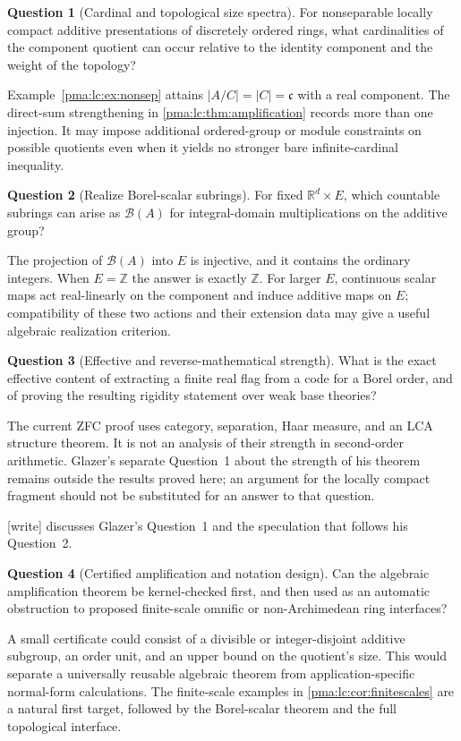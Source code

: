 \documentclass[11pt]{article}
\numberwithin{equation}{section}
\theoremstyle{definition}
\newtheorem{question}[question]{Question}
\theoremstyle{remark}
\newcommand{\Z}{\mathbb Z}
\newcommand{\R}{\mathbb R}
\newcommand{\writetag}{\textup{\textsf{\small[write]}}}
\begin{document}
\begin{question}[Cardinal and topological size spectra]
For nonseparable locally compact additive presentations of discretely
ordered rings, what cardinalities of the component quotient can occur
relative to the identity component and the weight of the topology?
\end{question}
Example~\ref{pma:lc:ex:nonsep} attains $|A/C|=|C|=\mathfrak c$ with a real
component. The direct-sum strengthening in
\cref{pma:lc:thm:amplification} records more than one injection. It may impose
additional ordered-group or module constraints on possible quotients
even when it yields no stronger bare infinite-cardinal inequality.

\begin{question}[Realize Borel-scalar subrings]
For fixed $\R^d\times E$, which countable subrings can arise as
$\mathcal B(A)$ for integral-domain multiplications on the additive group?
\end{question}
The projection of $\mathcal B(A)$ into $E$ is injective, and it contains
the ordinary integers. When $E=\Z$ the answer is exactly $\Z$.
For larger $E$, continuous scalar maps act real-linearly on the
component and induce additive maps on $E$; compatibility of these two
actions and their extension data may give a useful algebraic
realization criterion.

\begin{question}[Effective and reverse-mathematical strength]
What is the exact effective content of extracting a finite real flag
from a code for a Borel order, and of proving the resulting rigidity
statement over weak base theories?
\end{question}
The current ZFC proof uses category, separation, Haar measure, and
an LCA structure theorem. It is not an analysis of their strength in
second-order arithmetic. Glazer's separate Question~1 about the strength
of his theorem \cite{Glazer} remains outside the results proved here;
an argument for the locally compact fragment should not be substituted
for an answer to that question.

\noindent\writetag{}  discusses Glazer's Question~1 and
the speculation that follows his Question~2.

\begin{question}[Certified amplification and notation design]
Can the algebraic amplification theorem be kernel-checked first, and
then used as an automatic obstruction to proposed finite-scale
omnific or non-Archimedean ring interfaces?
\end{question}
A small certificate could consist of a divisible or integer-disjoint
additive subgroup, an order unit, and an upper bound on the quotient's
size. This would separate a universally reusable algebraic theorem
from application-specific normal-form calculations. The finite-scale
examples in \cref{pma:lc:cor:finitescales} are a natural first target, followed
by the Borel-scalar theorem and the full topological interface.
\end{document}
